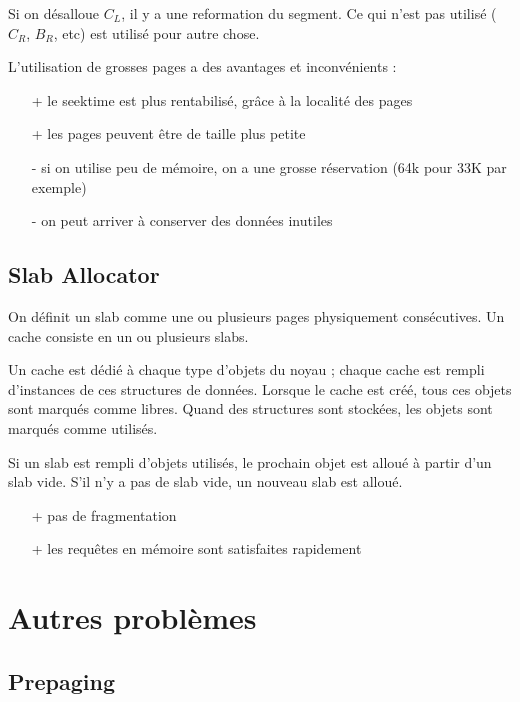 
Si on désalloue $C_L$, il y a une reformation du segment. Ce qui n'est pas utilisé ($C_R$, $B_R$, etc) est utilisé pour autre chose.

L'utilisation de grosses pages a des avantages et inconvénients :
\begin{itemize}
	\item[+] le seektime est plus rentabilisé, grâce à la localité des pages
	\item[+] les pages peuvent être de taille plus petite
	\item[-] si on utilise peu de mémoire, on a une grosse réservation (64k pour 33K par exemple)
	\item[-] on peut arriver à conserver des données inutiles
\end{itemize}

\subsection{Slab Allocator}

On définit un slab comme une ou plusieurs pages physiquement consécutives. Un cache consiste en un ou plusieurs slabs.


Un cache est dédié à chaque type d'objets du noyau ; chaque cache est rempli d'instances de ces structures de données. Lorsque le cache est créé, tous ces objets sont marqués comme libres. Quand des structures sont stockées, les objets sont marqués comme utilisés.

Si un slab est rempli d'objets utilisés, le prochain objet est alloué à partir d'un slab vide. S'il n'y a pas de slab vide, un nouveau slab est alloué.

\begin{itemize}
	\item[+] pas de fragmentation
	\item[+] les requêtes en mémoire sont satisfaites rapidement
\end{itemize}

\section{Autres problèmes}

	\subsection{Prepaging}
	
